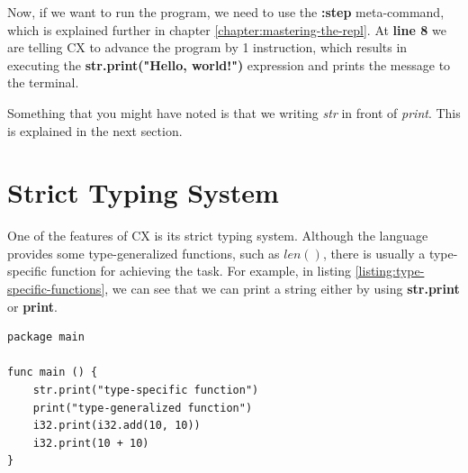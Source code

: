 \documentclass[11pt,fleqn,openany]{book} %
\begin{document}
Now, if we want to run the program, we need to use the \textbf{:step} meta-command, which is explained further in chapter \ref{chapter:mastering-the-repl}. At \textbf{line 8} we are telling CX to advance the program by 1 instruction, which results in executing the \textbf{str.print("Hello, world!")} expression and prints the message to the terminal.

Something that you might have noted is that we writing \textit{str} in front of \textit{print}. This is explained in the next section.

\section{Strict Typing System}


One of the features of CX is its strict typing system. Although the language provides some type-generalized functions, such as $len()$, there is usually a type-specific function for achieving the task. For example, in listing \ref{listing:type-specific-functions}, we can see that we can print a string either by using \textbf{str.print} or \textbf{print}.

\begin{lstlisting}[caption={Type-specific functions},captionpos=b,label={listing:type-specific-functions}]
package main

func main () {
 	str.print("type-specific function")
    print("type-generalized function")
    i32.print(i32.add(10, 10))
    i32.print(10 + 10)
}
\end{lstlisting}
\end{document}
